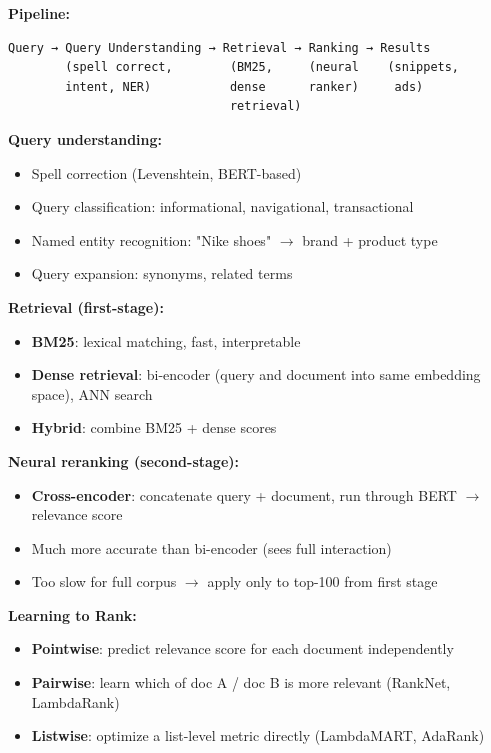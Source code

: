 \documentclass[11pt]{article}
\providecommand{\tightlist}{\setlength{\itemsep}{1pt}\setlength{\parskip}{0pt}}
\begin{document}
\textbf{Pipeline:}

\setcodelang{}

\begin{verbatim}
Query → Query Understanding → Retrieval → Ranking → Results
        (spell correct,        (BM25,     (neural    (snippets,
        intent, NER)           dense      ranker)     ads)
                               retrieval)
\end{verbatim}

\textbf{Query understanding:}

\begin{itemize}
\tightlist
\item
  Spell correction (Levenshtein, BERT-based)
\item
  Query classification: informational, navigational, transactional
\item
  Named entity recognition: "Nike shoes" \(\rightarrow\) brand + product type
\item
  Query expansion: synonyms, related terms
\end{itemize}

\textbf{Retrieval (first-stage):}

\begin{itemize}
\tightlist
\item
  \textbf{BM25}: lexical matching, fast, interpretable
\item
  \textbf{Dense retrieval}: bi-encoder (query and document into same embedding space), ANN search
\item
  \textbf{Hybrid}: combine BM25 + dense scores
\end{itemize}

\textbf{Neural reranking (second-stage):}

\begin{itemize}
\tightlist
\item
  \textbf{Cross-encoder}: concatenate query + document, run through BERT \(\rightarrow\) relevance score
\item
  Much more accurate than bi-encoder (sees full interaction)
\item
  Too slow for full corpus \(\rightarrow\) apply only to top-100 from first stage
\end{itemize}

\textbf{Learning to Rank:}

\begin{itemize}
\tightlist
\item
  \textbf{Pointwise}: predict relevance score for each document independently
\item
  \textbf{Pairwise}: learn which of doc A / doc B is more relevant (RankNet, LambdaRank)
\item
  \textbf{Listwise}: optimize a list-level metric directly (LambdaMART, AdaRank)
\end{itemize}
\end{document}
